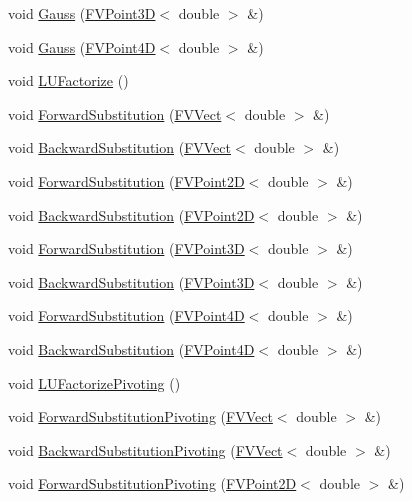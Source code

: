 \begin{DoxyCompactItemize}
\item 
void \hyperlink{classFVDenseM_a864f4adb3fe4e5c6d74daa5cedd3df7c}{Gauss} (\hyperlink{classFVPoint3D}{FVPoint3D}$<$ double $>$ \&)
\item 
void \hyperlink{classFVDenseM_a3c4182b71aecdfec9ad09371357718de}{Gauss} (\hyperlink{classFVPoint4D}{FVPoint4D}$<$ double $>$ \&)
\item 
void \hyperlink{classFVDenseM_af59b5802fb916dad62140d59f266dc5d}{LUFactorize} ()
\item 
void \hyperlink{classFVDenseM_a7f0e2f87410bc98b81e4b45bc93dc8c7}{ForwardSubstitution} (\hyperlink{classFVVect}{FVVect}$<$ double $>$ \&)
\item 
void \hyperlink{classFVDenseM_a3749badec5bcc0b96381564309b61f5c}{BackwardSubstitution} (\hyperlink{classFVVect}{FVVect}$<$ double $>$ \&)
\item 
void \hyperlink{classFVDenseM_a22fd244ada8027b00b4e8e719b12b98d}{ForwardSubstitution} (\hyperlink{classFVPoint2D}{FVPoint2D}$<$ double $>$ \&)
\item 
void \hyperlink{classFVDenseM_a7b446c084839b05d16f40bfc87d7240f}{BackwardSubstitution} (\hyperlink{classFVPoint2D}{FVPoint2D}$<$ double $>$ \&)
\item 
void \hyperlink{classFVDenseM_a9ccdde3331a8053bcb9d0ad20abd46bd}{ForwardSubstitution} (\hyperlink{classFVPoint3D}{FVPoint3D}$<$ double $>$ \&)
\item 
void \hyperlink{classFVDenseM_a7018eb739af43b8ff3b6d457437f29ab}{BackwardSubstitution} (\hyperlink{classFVPoint3D}{FVPoint3D}$<$ double $>$ \&)
\item 
void \hyperlink{classFVDenseM_aee73578def2da3a5cec6d63ca1dd16f7}{ForwardSubstitution} (\hyperlink{classFVPoint4D}{FVPoint4D}$<$ double $>$ \&)
\item 
void \hyperlink{classFVDenseM_ac04bef4f6b253ceba7f0a11d68d48d26}{BackwardSubstitution} (\hyperlink{classFVPoint4D}{FVPoint4D}$<$ double $>$ \&)
\item 
void \hyperlink{classFVDenseM_a14f7b6677261c452cf1d7b2e674df9a3}{LUFactorizePivoting} ()
\item 
void \hyperlink{classFVDenseM_a98ff2d70d8ac97a2d8c1a6a109285fb9}{ForwardSubstitutionPivoting} (\hyperlink{classFVVect}{FVVect}$<$ double $>$ \&)
\item 
void \hyperlink{classFVDenseM_afdda7cd3e2492739a87f026cf6ac55ea}{BackwardSubstitutionPivoting} (\hyperlink{classFVVect}{FVVect}$<$ double $>$ \&)
\item 
void \hyperlink{classFVDenseM_aa2d2bc1b0cb10097d02a1d41ea963d56}{ForwardSubstitutionPivoting} (\hyperlink{classFVPoint2D}{FVPoint2D}$<$ double $>$ \&)

\end{DoxyCompactItemize}
